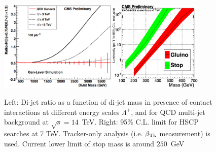 \documentclass{PoS}
\begin{document}
\begin{figure}[htbp] 
\centering
\includegraphics[width=0.5\textwidth]{DiJetRatio100pbOptFix.eps}\includegraphics[width=0.4\textwidth]{HSCP1.eps}  
\caption{Left: Di-jet ratio as a function of di-jet mass in presence of 
contact interactions at different energy scales $\Lambda^{+}$, 
and for QCD multi-jet background at $\sqrt{s} = 14$~TeV.  
Right: 95\% C.L. limit for HSCP searches at 7 TeV. Tracker-only analysis (i.e. $\beta_{{\rm Tk}}$ measurement) is used. 
Current lower limit of stop mass is around $250$~GeV~\cite{Abazov:2008quETAaltonen:2009kea}}
\label{fig:DiJetRatioAndHSCP}
\end{figure}
\end{document}
